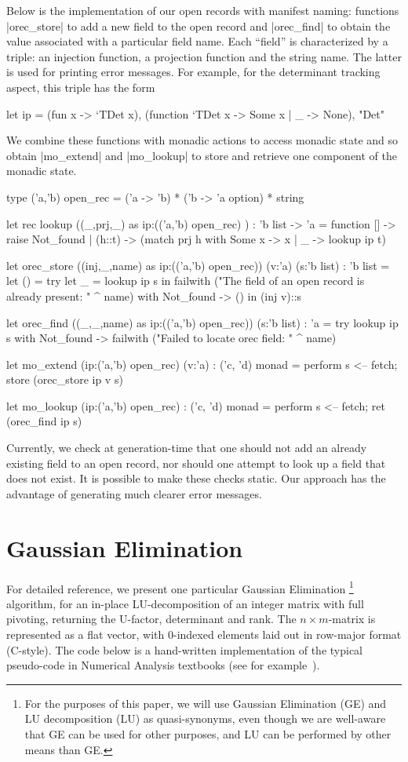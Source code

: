 \documentclass{elsart}
\begin{document}
Below is the implementation of our open records with manifest
naming: functions |orec_store| to add a new field to the open record
and |orec_find| to obtain the value associated with a particular field
name. Each ``field'' is characterized by a triple: an injection function, 
a projection function and the string name. The latter is used for 
printing error messages. For example, for the
determinant tracking aspect, this triple has the form
\begin{code}
let ip = 
  (fun x -> `TDet x), (function `TDet x -> Some x | _ -> None), "Det"
\end{code}
We combine these functions with monadic
actions to access monadic state and so obtain 
|mo_extend| and |mo_lookup| to store and retrieve one component 
of the monadic state.
\begin{code}
type ('a,'b) open_rec = ('a -> 'b) * ('b -> 'a option)  * string

let rec lookup ((_,prj,_) as ip:(('a,'b) open_rec) )
   : 'b list -> 'a = 
   function [] -> raise Not_found
   | (h::t) -> (match prj h with Some x -> x | _ -> lookup ip t)

let orec_store ((inj,_,name) as ip:(('a,'b) open_rec)) (v:'a) (s:'b list) 
   : 'b list =
  let () = 
    try let _ = lookup ip s in 
        failwith ("The field of an open record is already present: " ^ name)
    with Not_found -> () in
  (inj v)::s

let orec_find ((_,_,name) as ip:(('a,'b) open_rec)) (s:'b list) : 'a =
  try lookup ip s 
  with Not_found -> failwith ("Failed to locate orec field: " ^ name)

let mo_extend (ip:('a,'b) open_rec) (v:'a) : ('c, 'd) monad = 
  perform s <-- fetch; store (orec_store ip v s)

let mo_lookup (ip:('a,'b) open_rec) : ('c, 'd) monad =
  perform s <-- fetch; ret (orec_find ip s)
\end{code}
%
Currently, we check at generation-time that one should not add an
already existing field to an open record, nor should one attempt to
look up a field that does not exist. It is possible to make these
checks static.  Our approach has the advantage of generating much
clearer error messages.

\section{Gaussian Elimination}\label{GE-algorithm}

For detailed reference, we present one particular Gaussian Elimination%
\footnote{For the purposes of this paper, we will use Gaussian Elimination (GE)
and LU decomposition (LU) as quasi-synonyms, even though we are well-aware
that GE can be used for other purposes, and LU can be performed by other
means than GE.}
algorithm, for an in-place LU-decomposition of an integer matrix with
full pivoting, returning the U-factor, determinant and rank. The
$n\times m$-matrix is represented as a flat vector, with 0-indexed
elements laid out in row-major format (C-style). The code below is
a hand-written implementation of the typical pseudo-code in
Numerical Analysis textbooks (see for example~\cite{BurdenFaires89}).
\end{document}
